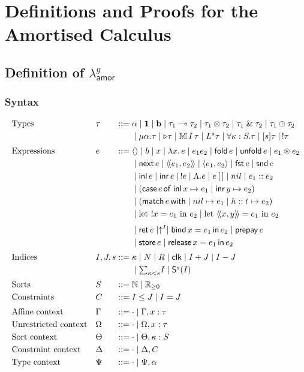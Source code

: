 \chapter{Definitions and Proofs for the Amortised Calculus}\label{chap:appendix2}

\section{Definition of $\lambda^{g}_\mathsf{amor}$}
\subsection{Syntax}
\[
\begin{alignedat}{3}
 &\text{Types} &\quad &\tau &\;::={}&
   \alpha\mid\textbf{1}\mid\textbf{b}\mid\tau_1\multimap\tau_2
   \mid\tau_1\otimes\tau_2\mid\tau_1\;\&\;\tau_2\mid\tau_1\oplus\tau_2\\
 &&&&&\mid\mu\alpha.\tau\mid\triangleright\tau\mid\mathbb{M}\,{I}\, \tau
   \mid L^s\tau\mid\forall\kappa:S.\tau\mid[s]\tau\mid\,!\tau\\[.6ex]
 &\text{Expressions} &&e &\;::={}&\langle\rangle\mid b \mid x \mid \lambda x.\,e\mid e_1e_2
   \mid\mathsf{fold}\, e\mid\mathsf{unfold}\, e\mid e_1\circledast e_2\\
 &&&&&\mid\mathsf{next}\, e\mid\langle\!\langle e_1, e_2\rangle\!\rangle \mid \langle e_1, e_2\rangle
   \mid\mathsf{fst}\,e\mid\mathsf{snd}\,e\\
 &&&&&\mid\mathsf{inl}\,e\mid\mathsf{inr}\,e\mid \,!e\mid \Lambda.e \mid e\,[\,]\mid nil \mid e_1::e_2\\
 &&&&&\mid(\mathsf{case}\,e\,\mathsf{of}\; \mathsf{inl}\,x\mapsto e_1\mid\mathsf{inr}\,y\mapsto e_2)\\
 &&&&&\mid(\mathsf{match}\,e\,\mathsf{with} \mid nil\mapsto e_1\mid h::t\mapsto e_2)\\
 &&&&&\mid\text{let }!x = e_1 \text{ in } e_2\mid\text{let }\langle\!\langle x, y\rangle\!\rangle = e_1 \text{ in } e_2\\[.6ex]
 &&&&&\mid\mathsf{ret}\, e\mid\uparrow^{I}\mid\mathsf{bind}\, x= e_1 \, \mathsf{in}\, e_2\mid\mathsf{prepay}\, e\\
 &&&&&\mid\mathsf{store}\, e\mid\mathsf{release}\, x = e_1 \, \mathsf{in}\, e_2\\[.6ex]
 &\text{Indices} &&I,J,s&\;::={}&\kappa\mid N\mid R\mid\mathsf{clk}\mid I+J\mid I-J\\
 &&&&&\mid\textstyle{\sum}_{\kappa<s}I\mid\mathsf{S}^s(I)\\[.6ex]
 &\text{Sorts} &&S &\;::={}&\mathbb N\mid\mathbb R_{\ge0} \\
 &\text{Constraints} &&C &\;::={}&I\leq J\mid I=J\\[.6ex]
 &\text{Affine context} &&\Gamma &\;::={}&\cdot\mid\Gamma,x:\tau\\
 &\text{Unrestricted context} &&\Omega &\;::={}&\cdot\mid\Omega,x:\tau\\
 &\text{Sort context} &&\Theta &\;::={}&\cdot\mid\Theta,\kappa:S\\
 &\text{Constraint context} &&\Delta &\;::={}&\cdot\mid\Delta,C\\
 &\text{Type context} &&\Psi &\;::={}&\cdot\mid\Psi,\alpha
\end{alignedat}
\]

